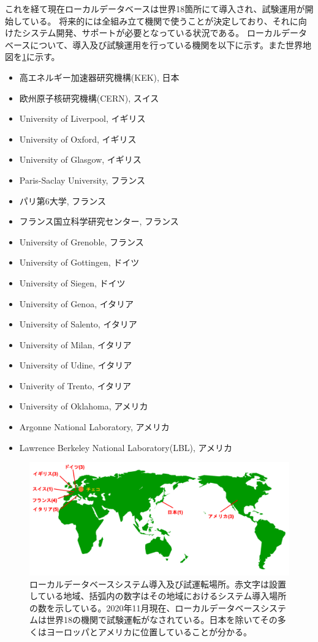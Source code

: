 これを経て現在ローカルデータベースは世界18箇所にて導入され、試験運用が開始している。
将来的には全組み立て機関で使うことが決定しており、それに向けたシステム開発、サポートが必要となっている状況である。
ローカルデータベースについて、導入及び試験運用を行っている機関を以下に示す。また世界地図を\ref{localdb_world_map}に示す。

\begin{itemize}
  \item 高エネルギー加速器研究機構(KEK), 日本
  \item 欧州原子核研究機構(CERN), スイス
  \item University of Liverpool, イギリス
  \item University of Oxford, イギリス
  \item University of Glasgow, イギリス
  \item Paris-Saclay University, フランス
  \item パリ第6大学, フランス
  \item フランス国立科学研究センター, フランス
  \item University of Grenoble, フランス
  \item University of Gottingen, ドイツ
  \item University of Siegen, ドイツ
  \item University of Genoa, イタリア
  \item University of Salento, イタリア
  \item University of Milan, イタリア
  \item University of Udine, イタリア
  \item Univerity of Trento, イタリア
  \item University of Oklahoma, アメリカ
  \item Argonne National Laboratory, アメリカ
  \item Lawrence Berkeley National Laboratory(LBL), アメリカ
\end{itemize}

\begin{figure}[bpt]\centering
\includegraphics[width=14cm]{./localdb_world_map.png}
\caption[ローカルデータベースシステム導入及び試運転場所]{ローカルデータベースシステム導入及び試運転場所。赤文字は設置している地域、括弧内の数字はその地域におけるシステム導入場所の数を示している。2020年11月現在、ローカルデータベースシステムは世界18の機関で試験運転がなされている。日本を除いてその多くはヨーロッパとアメリカに位置していることが分かる。}
\label{localdb_world_map}
\end{figure}



